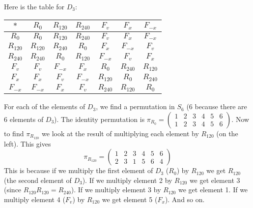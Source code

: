 \protect \documentclass [11pt]{exam}
\renewenvironment{Ans}[1]{\setcounter{question}{#1}\addtocounter{question}{-1}\question }{}
\begin{document}
 \begin{questions}
\begin{Ans}{1}
  Here is the table for $D_3$:

          \def\a{$R_{0}$}
      \def\b{$R_{120}$}
      \def\c{$R_{240}$}
      \def\d{$F_v$}
      \def\e{$F_x$}
      \def\f{$F_{-x}$}

 \begin{tabular}{c|cccccc}
  $\ast$ & \a & \b & \c & \d & \e & \f \\ \hline
  \a & \a & \b & \c & \d & \e & \f \\
  \b & \b & \c & \a & \e & \f & \d \\
  \c & \c & \a & \b & \f & \d & \e \\
  \d & \d & \f & \e & \a & \c & \b \\
  \e & \e & \d & \f & \b & \a & \c \\
  \f & \f & \e & \d & \c & \b & \a
 \end{tabular}

 For each of the elements of $D_3$, we find a permutation in $S_6$ (6 because there are 6 elements of $D_3$). The identity permutation is $\pi_{R_0} = \begin{pmatrix}1 & 2 & 3 & 4 & 5 & 6 \\ 1 & 2 & 3 & 4 & 5 & 6\end{pmatrix}$.   Now to find $\pi_{R_{120}}$ we look at the result of multiplying each element by $R_{120}$ (on the left).  This gives
 \[\pi_{R_{120}} = \begin{pmatrix} 1 & 2 & 3 & 4 & 5 & 6 \\ 2 & 3 & 1 & 5 & 6 & 4\end{pmatrix}\]
 This is because if we multiply the first element of $D_3$ ($R_0$) by $R_{120}$ we get $R_{120}$ (the second element of $D_3$).  If we multiply element 2 by $R_{120}$ we get element 3 (since $R_{120}R_{120} = R_{240}$).  If we multiply element 3 by $R_{120}$ we get element 1.  If we multiply element 4 ($F_{v}$) by $R_{120}$ we get element 5 ($F_x$).  And so on.


\end{Ans}
\end{questions}
\end{document}
